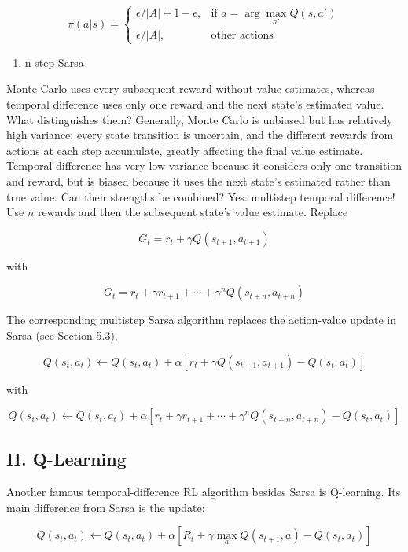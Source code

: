 \[
\pi(a|s)=
\begin{cases}
\epsilon/|A|+1-\epsilon, & \text{if }a=\arg\max_{a'}Q(s,a')\\
\epsilon/|A|, & \text{other actions}
\end{cases}
\]

\begin{enumerate}
\def\labelenumi{\arabic{enumi}.}
\setcounter{enumi}{1}
\tightlist
\item
  n-step Sarsa
\end{enumerate}

Monte Carlo uses every subsequent reward without value estimates, whereas temporal difference uses only one reward and the next state's estimated value. What distinguishes them? Generally, Monte Carlo is unbiased but has relatively high variance: every state transition is uncertain, and the different rewards from actions at each step accumulate, greatly affecting the final value estimate. Temporal difference has very low variance because it considers only one transition and reward, but is biased because it uses the next state's estimated rather than true value. Can their strengths be combined? Yes: multistep temporal difference! Use \(n\) rewards and then the subsequent state's value estimate. Replace

\[
G_t=r_t+\gamma Q(s_{t+1},a_{t+1})
\]

with

\[
G_t=r_t+\gamma r_{t+1}+\cdots+\gamma^n Q(s_{t+n},a_{t+n})
\]

The corresponding multistep Sarsa algorithm replaces the action-value update in Sarsa (see Section 5.3),

\[
Q(s_t,a_t)\leftarrow Q(s_t,a_t)+\alpha[r_t+\gamma Q(s_{t+1},a_{t+1})-Q(s_t,a_t)]
\]

with

\[
Q(s_t,a_t)\leftarrow Q(s_t,a_t)+\alpha[r_t+\gamma r_{t+1}+\cdots+\gamma^n Q(s_{t+n},a_{t+n})-Q(s_t,a_t)]
\]

\hypertarget{ii.-q-learning}{%
\subsection{II. Q-Learning}\label{ii.-q-learning}}

Another famous temporal-difference RL algorithm besides Sarsa is Q-learning. Its main difference from Sarsa is the update:

\[
Q(s_t,a_t)\leftarrow Q(s_t,a_t)+\alpha[R_t+\gamma\max_a Q(s_{t+1},a)-Q(s_t,a_t)]
\]

